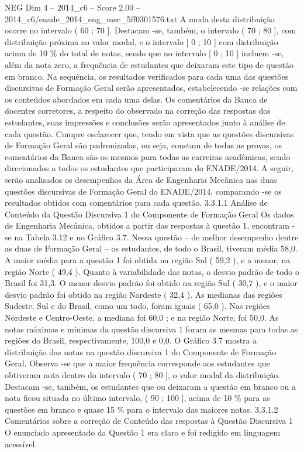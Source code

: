 \begin{textsample}{NEG Dim 4 – 2014\_c6 – Score 2.00 – 2014\_c6/enade\_2014\_eng\_mec\_5ff0301576.txt}
A moda desta distribuição ocorre no intervalo ( 60 ; 70 ].
Destacam -se, também, o intervalo ( 70 ; 80 ], com distribuição próxima ao valor modal, e o intervalo [ 0 ; 10 ] com distribuição acima de 10 \% do total de notas, sendo que no intervalo [ 0 ; 10 ] incluem -se, além da nota zero, a frequência de estudantes que deixaram este tipo de questão em branco.
Na sequência, os resultados verificados para cada uma das questões discursivas de Formação Geral serão apresentados, estabelecendo -se relações com os conteúdos abordados em cada uma delas.
Os comentários da Banca de docentes corretores, a respeito do observado na correção das respostas dos estudantes, suas impressões e conclusões serão apresentados junto à análise de cada questão.
Cumpre esclarecer que, tendo em vista que as questões discursivas de Formação Geral são padronizadas, ou seja, constam de todas as provas, os comentários da Banca são os mesmos para todas as carreiras acadêmicas, sendo direcionados a todos os estudantes que participaram do ENADE/2014.
A seguir, serão analisados os desempenhos da Área de Engenharia Mecânica nas duas questões discursivas de Formação Geral do ENADE/2014, comparando -se os resultados obtidos com comentários para cada questão. 3.3.1.1 Análise de Conteúdo da Questão Discursiva 1 do Componente de Formação Geral Os dados de Engenharia Mecânica, obtidos a partir das respostas à questão 1, encontram -se na Tabela 3.12 e no Gráfico 3.7.
Nessa questão – de melhor desempenho dentre as duas de Formação Geral – os estudantes, de todo o Brasil, tiveram média 58,0.
A maior média para a questão 1 foi obtida na região Sul ( 59,2 ), e a menor, na região Norte ( 49,4 ).
Quanto à variabilidade das notas, o desvio padrão de todo o Brasil foi 31,3.
O menor desvio padrão foi obtido na região Sul ( 30,7 ), e o maior desvio padrão foi obtido na região Nordeste ( 32,4 ).
As medianas das regiões Sudeste, Sul e do Brasil, como um todo, foram iguais ( 65,0 ).
Nas regiões Nordeste e Centro-Oeste, a mediana foi 60,0 ; e na região Norte, foi 50,0.
As notas máximas e mínimas da questão discursiva 1 foram as mesmas para todas as regiões do Brasil, respectivamente, 100,0 e 0,0.
O Gráfico 3.7 mostra a distribuição das notas na questão discursiva 1 do Componente de Formação Geral.
Observa -se que a maior frequência corresponde aos estudantes que obtiveram nota dentro do intervalo ( 70 ; 80 ], o valor modal da distribuição.
Destacam -se, também, os estudantes que ou deixaram a questão em branco ou a nota ficou situada no último intervalo, ( 90 ; 100 ], acima de 10 \% para as questões em branco e quase 15 \% para o intervalo das maiores notas. 3.3.1.2 Comentários sobre a correção de Conteúdo das respostas à Questão Discursiva 1 O enunciado apresentado da Questão 1 era claro e foi redigido em linguagem acessível.

\end{textsample}
